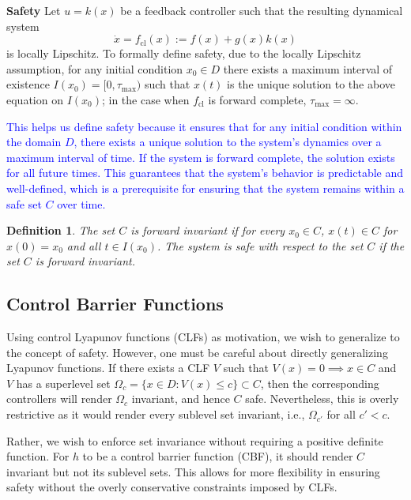 \documentclass[12pt]{article}
\begin{document}
\textbf{Safety}
Let \( u = k(x) \) be a feedback controller such that the resulting dynamical system
\[
\dot{x} = f_{\text{cl}}(x) := f(x) + g(x)k(x)
\]
is locally Lipschitz. To formally define safety, due to the locally Lipschitz assumption, for any initial condition \( x_0 \in D \) there exists a maximum interval of existence \( I(x_0) = [0, \tau_{\max}) \) such that \( x(t) \) is the unique solution to the above equation on \( I(x_0) \); in the case when \( f_{\text{cl}} \) is forward complete, \( \tau_{\max} = \infty \). 

\textcolor{blue}{
This helps us define safety because it ensures that for any initial condition within the domain \( D \), there exists a unique solution to the system's dynamics over a maximum interval of time. If the system is forward complete, the solution exists for all future times. This guarantees that the system's behavior is predictable and well-defined, which is a prerequisite for ensuring that the system remains within a safe set \( C \) over time.
}

\newtheorem{definition}{Definition}

\begin{definition}
The set \( C \) is forward invariant if for every \( x_0 \in C \), \( x(t) \in C \) for \( x(0) = x_0 \) and all \( t \in I(x_0) \). The system is safe with respect to the set \( C \) if the set \( C \) is forward invariant.
\end{definition}

\subsection{Control Barrier Functions}
Using control Lyapunov functions (CLFs) as motivation, we wish to generalize to the concept of safety. However, one must be careful about directly generalizing Lyapunov functions. If there exists a CLF \( V \) such that \( V(x) = 0 \implies x \in C \) and \( V \) has a superlevel set \( \Omega_c = \{ x \in D : V(x) \leq c \} \subset C \), then the corresponding controllers will render \( \Omega_c \) invariant, and hence \( C \) safe. Nevertheless, this is overly restrictive as it would render every sublevel set invariant, i.e., \( \Omega_{c'} \) for all \( c' < c \). 

Rather, we wish to enforce set invariance without requiring a positive definite function. For \( h \) to be a control barrier function (CBF), it should render \( C \) invariant but not its sublevel sets. This allows for more flexibility in ensuring safety without the overly conservative constraints imposed by CLFs.
\end{document}
